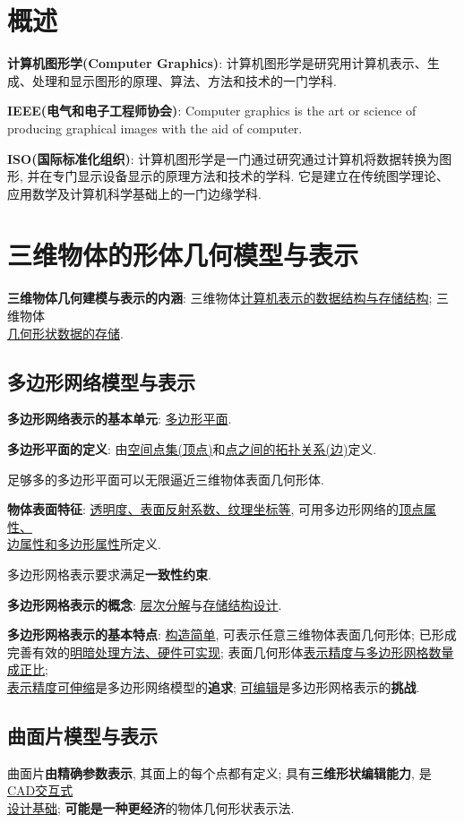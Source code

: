 \documentclass[12pt, a4paper, oneside]{ctexart}
\def\ul{\underline}         %
\def\bf{\textbf}            %
\begin{document}
\section{概述}
\textbf{计算机图形学(Computer Graphics)}: 计算机图形学是研究用计算机表示、生成、处理和显示图形的原理、算法、方法和技术的一门学科.

\textbf{IEEE(电气和电子工程师协会)}: Computer graphics is the art or science of producing graphical images with the aid of computer.

\textbf{ISO(国际标准化组织)}: 计算机图形学是一门通过研究通过计算机将数据转换为图形, 并在专门显示设备显示的原理方法和技术的学科. 它是建立在传统图学理论、应用数学及计算机科学基础上的一门边缘学科.

\section{三维物体的形体几何模型与表示}
\textbf{三维物体几何建模与表示的内涵}: 三维物体\ul{计算机表示的数据结构与存储结构}; 三维物体\\\ul{几何形状数据的存储}.

\subsection{多边形网络模型与表示}
\bf{多边形网络表示的基本单元}: \ul{多边形平面}.

\bf{多边形平面的定义}: 由\ul{空间点集(顶点)}和\ul{点之间的拓扑关系(边)}定义.

足够多的多边形平面可以无限逼近三维物体表面几何形体. 

\bf{物体表面特征}: \ul{透明度、表面反射系数、纹理坐标等}, 可用多边形网络的\ul{顶点属性、}\\\ul{边属性和多边形属性}所定义.

多边形网格表示要求满足\bf{一致性约束}.

\bf{多边形网格表示的概念}: \ul{层次分解}与\ul{存储结构设计}.

\bf{多边形网格表示的基本特点}: \ul{构造简单}, 可表示任意三维物体表面几何形体; 已形成完善有效的\ul{明暗处理方法、硬件可实现}; 表面几何形体\ul{表示精度与多边形网格数量成正比}; \\\ul{表示精度可伸缩}是多边形网络模型的\bf{追求}; \ul{可编辑}是多边形网格表示的\bf{挑战}.

\subsection{曲面片模型与表示}
曲面片\bf{由精确参数表示}, 其面上的每个点都有定义; 具有\bf{三维形状编辑能力}, 是\ul{CAD交互式}\\\ul{设计基础}; \bf{可能是一种更经济}的物体几何形状表示法.
\end{document}
